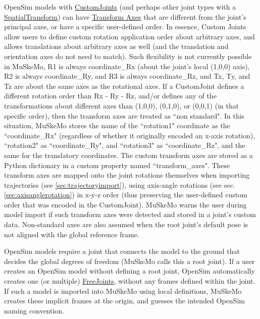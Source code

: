 \documentclass{article}
\begin{document}
OpenSim models with \href{https://simtk.org/api_docs/opensim/api_docs/classOpenSim_1_1CustomJoint.html}{CustomJoints} (and perhaps other joint types with a \href{https://simtk.org/api_docs/opensim/api_docs/classOpenSim_1_1SpatialTransform.html}{SpatialTransform}) can have \href{https://simtk.org/api_docs/opensim/api_docs/classOpenSim_1_1TransformAxis.html}{Transform Axes} that are different from the joint's principal axes, or have a specific user-defined order. In essence, Custom Joints allow users to define custom rotation application order about arbitrary axes, and allows translations about arbitrary axes as well (and the translation and orientation axes do not need to match). Such flexibility is not currently possible in MuSkeMo, R1 is always coordinate\_Rx (about the joint's local (1,0,0) axis), R2 is always coordinate\_Ry, and R3 is always coordinate\_Rz, and Tx, Ty, and Tz are about the same axes as the rotational axes. If a CustomJoint defines a different rotation order than Rx - Ry - Rz, and/or defines any of the transformations about different axes than (1,0,0), (0,1,0), or (0,0,1) (in that specific order), then the transform axes are treated as ``non standard". In this situation, MuSkeMo stores the name of the ``rotation1" coordinate as the ``coordinate\_Rx" (regardless of whether it originally encoded an x-axis rotation), ``rotation2" as ``coordinate\_Ry", and ``rotation3" as ``coordinate\_Rz", and the same for the translatory coordinates. The custom transform axes are stored as a Python dictionary in a custom property named ``transform\_axes". These transform axes are mapped onto the joint rotations themselves when importing trajectories (see \ref{sec:trajectoryimport}), using axis-angle rotations (see sec. \ref{sec:axisanglerotation}) in x-y-z order (thus preserving the user-defined custom order that was encoded in the CustomJoint). MuSkeMo warns the user during model import if such transform axes were detected and stored in a joint's custom data.
Non-standard axes are also assumed when the root joint's default pose is not aligned with the global reference frame.



OpenSim models require a joint that connects the model to the ground that decides the global degrees of freedom (MuSkeMo calls this a root joint). If a user creates an OpenSim model without defining a root joint, OpenSim automatically creates one (or multiple) \href{https://simtk.org/api_docs/opensim/api_docs/classOpenSim_1_1FreeJoint.html}{FreeJoints}, without any frames defined within the joint. If such a model is imported into MuSkeMo using local definitions, MuSkeMo creates these implicit frames at the origin, and guesses the intended OpenSim naming convention.
\end{document}
